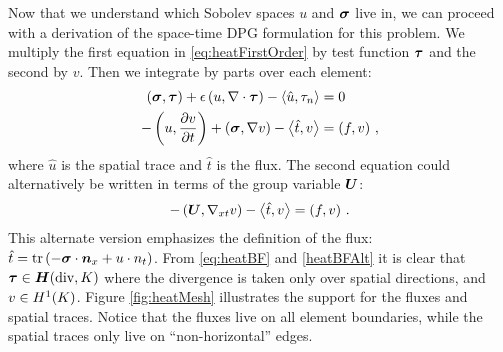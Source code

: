 \documentclass[Proposal.tex]{subfiles}
\begin{document}
Now that we understand which Sobolev spaces $u$ and $\boldsymbol\sigma$ live in, we can proceed with a derivation of the space-time DPG formulation for this problem.
We multiply the first equation in \eqref{eq:heatFirstOrder} by test function $\boldsymbol\tau$ and the second by $v$. Then we integrate by parts over each element:
\begin{equation}
\label{eq:heatBF}
	\begin{aligned}
		\left( \boldsymbol\sigma,\boldsymbol\tau \right)+\epsilon\left( u,\nabla\cdot\boldsymbol\tau \right)-\left\langle \hat u,\tau_n \right\rangle&=0\\
		-\left( u,\frac{\partial v}{\partial t} \right)+\left( \boldsymbol\sigma,\nabla v \right)-\left\langle \hat t,v \right\rangle&=\left( f,v \right)\,,
	\end{aligned}
\end{equation}
where $\hat u$ is the spatial trace and $\hat t$ is the flux.
The second equation could alternatively be written in terms of the group variable $\boldsymbol U$:
\begin{equation}
\label{heatBFAlt}
-\left( \boldsymbol U,\nabla_{xt} v \right)-\left\langle \hat t,v \right\rangle=\left( f,v \right)\,.
\end{equation}
This alternate version emphasizes the definition of the flux: $\hat t=\operatorname*{tr}\left( -\boldsymbol\sigma\cdot\boldsymbol n_x+u\cdot n_t \right)$.
From \eqref{eq:heatBF} and \eqref{heatBFAlt} it is clear that $\boldsymbol\tau\in\mbox{\boldmath $H$}(\text{div},K)$ where the divergence is taken only over spatial directions, and $v\in H^{1}(K)$.
Figure \ref{fig:heatMesh} illustrates the support for the fluxes and spatial traces. Notice that the fluxes live on all element boundaries, while the spatial traces only live on ``non-horizontal'' edges.
\end{document}
